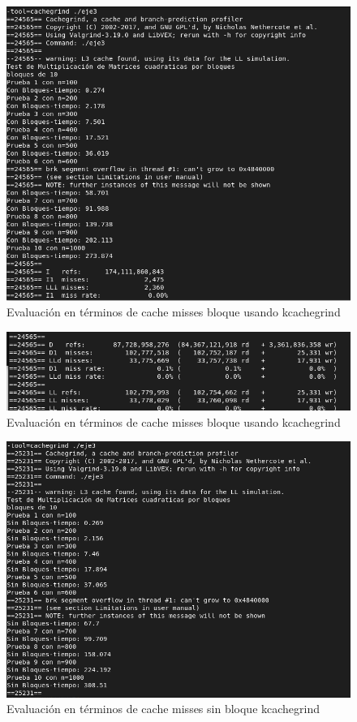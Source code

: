 \documentclass{article}
\begin{document}
\begin{enumerate}
  \begin{figure}[H]
    \centering
   \includegraphics[width=0.8\linewidth]{imagenes/Captura de pantalla de 2023-09-24 22-04-01.png}
   \caption{Evaluación en términos de cache misses  bloque usando kcachegrind}
\end{figure}

\begin{figure}[H]
    \centering
   \includegraphics[width=0.8\linewidth]{imagenes/Captura de pantalla de 2023-09-24 22-04-39.png}
   \caption{Evaluación en términos de cache misses bloque  usando kcachegrind}
\end{figure}


\begin{figure}[H]
    \centering
   \includegraphics[width=0.8\linewidth]{imagenes/Captura de pantalla de 2023-09-24 22-36-24.png}
   \caption{Evaluación en términos de cache misses sin bloque kcachegrind }
\end{figure}


\end{enumerate}
\end{document}
